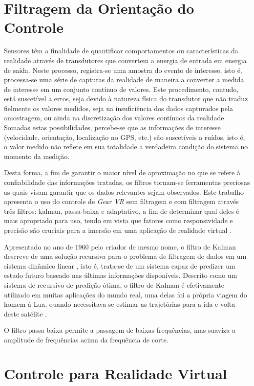 \documentclass[conference]{IEEEtran}
\begin{document}
\section{Filtragem da Orientação do Controle} \label{sec:filters}
Sensores têm a finalidade de quantificar comportamentos ou características da realidade através de transdutores que convertem a energia de entrada em energia de saída. Neste processo, registra-se uma amostra do evento de interesse, isto é, processa-se uma série de capturas da realidade de maneira a converter a medida de interesse em um conjunto contínuo de valores. Este procedimento, contudo, está suscetível a erros, seja devido à natureza física do transdutor que não traduz fielmente os valores medidos, seja na insuficiência dos dados capturados pela amostragem, ou ainda na discretização dos valores contínuos da realidade. Somadas estas possibilidades, percebe-se que as informações de interesse (velocidade, orientação, localização no GPS, etc.) são suscetíveis a ruídos, isto é, o valor medido não reflete em sua totalidade a verdadeira condição do sistema no momento da medição.

Desta forma, a fim de garantir o maior nível de aproximação no que se refere à confiabilidade das informações tratadas, os filtros tornam-se ferramentas preciosas as quais visam garantir que os dados relevantes sejam observados. Este trabalho apresenta o uso do controle de \textit{Gear VR} sem filtragem e com filtragem através três filtros: kalman, passa-baixa e adaptativo, a fim de determinar qual deles é mais apropriado para uso, tendo em vista que fatores como responsividade e precisão são cruciais para a imersão em uma aplicação de realidade virtual \cite{VRDataGlove}.

Apresentado no ano de 1960 pelo criador de mesmo nome, o filtro de Kalman descreve de uma solução recursiva para o problema de filtragem de dados em um sistema dinâmico linear \cite{WelchBishop}, isto é, trata-se de um sistema capaz de predizer um estado futuro baseado nas últimas informações disponíveis. Descrito como um sistema de recursivo de predição ótima, o filtro de Kalman é efetivamente utilizado em muitas aplicações do mundo real, uma delas foi a própria viagem do homem à Lua, quando necessitava-se estimar as trajetórias para a ida e volta deste satélite \cite{GrewalAndrews}.

O filtro passa-baixa permite a passagem de baixas frequências, mas suaviza a amplitude de frequências acima da frequência de corte.

\section{Controle para Realidade Virtual} \label{sec:vrcontroller}
\end{document}
